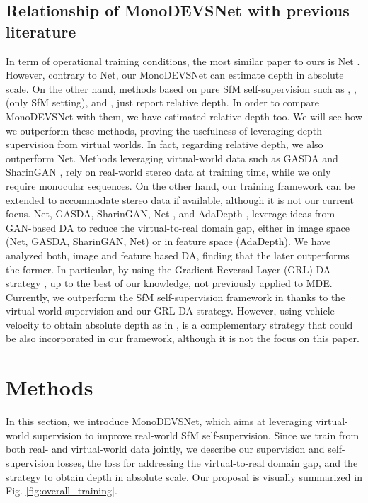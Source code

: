 \documentclass[journal]{IEEEtran}
\newcommand{\Fig}[1]{Fig. \ref{fig:#1}}
\begin{document}
\subsection{Relationship of MonoDEVSNet with previous literature} 
In term of operational training conditions, the most similar paper to ours is Net \cite{Cheng:2020S3Net}. However, contrary to Net, our MonoDEVSNet can estimate depth in absolute scale. On the other hand, methods based on pure SfM self-supervision such as \cite{Zhou:2017}, \cite{Yin:2018GeoNet}, \cite{Godard:2019MonoDepth2} (only SfM setting), and \cite{Guizilini:2020semantic}, just report relative depth. In order to compare MonoDEVSNet with them, we have estimated relative depth too. We will see how we outperform these methods, proving the usefulness of leveraging depth supervision from virtual worlds. In fact, regarding relative depth, we also outperform Net. Methods leveraging virtual-world data such as GASDA \cite{Zhao:2019GASDA} and SharinGAN \cite{Pnvr:2020SharinGAN}, rely on real-world stereo data at training time, while we only require monocular sequences. On the other hand, our training framework can be extended to accommodate stereo data if available, although it is not our current focus. Net, GASDA, SharinGAN, Net \cite{Zheng:2018T2Net}, and AdaDepth \cite{Kundu:2018AdaDepth}, leverage ideas from GAN-based DA to reduce the virtual-to-real domain gap, either in image space (Net, GASDA, SharinGAN, Net) or in feature space (AdaDepth). We have analyzed both, image and feature based DA, finding that the later outperforms the former. In particular, by using the Gradient-Reversal-Layer (GRL) DA strategy \cite{Ganin:2015, Ganin:2016}, up to the best of our knowledge, not previously applied to MDE. Currently, we outperform the SfM self-supervision framework in \cite{Guizilini:20203D} thanks to the virtual-world supervision and our GRL DA strategy. However, using vehicle velocity to obtain absolute depth as in \cite{Guizilini:20203D}, is a complementary strategy that could be also incorporated in our framework, although it is not the focus on this paper.



\section{Methods}
\label{sec:method}
In this section, we introduce MonoDEVSNet, which aims at leveraging virtual-world supervision to improve real-world SfM self-supervision. Since we train from both real- and virtual-world data jointly, we describe our supervision and self-supervision losses, the loss for addressing the virtual-to-real domain gap, and the strategy to obtain depth in absolute scale. Our proposal is visually summarized in \Fig{overall_training}.
\end{document}
